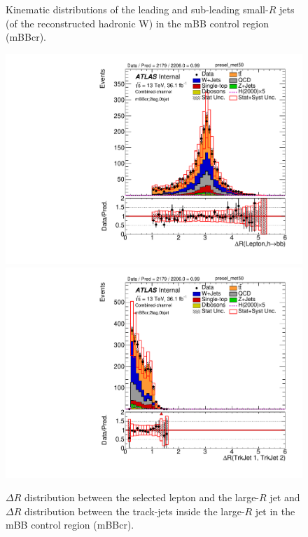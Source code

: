 \begin{figure}[!h]
\begin{center}
\caption{Kinematic distributions of the leading and sub-leading small-$R$ jets (of the reconstructed hadronic W)
in the mBB control region (mBBcr).}
\label{fig:boosted_mbbcr_whad_jets}
\end{center}
\end{figure}
 \newpage
\begin{figure}[!h]
\begin{center}
\includegraphics[scale=0.33]{./figures/boosted/PlotsInMbbCR/DataMC_2tag_0bjet_mbbcr_lepton_presel_met50_drHbbLep}
\includegraphics[scale=0.33]{./figures/boosted/PlotsInMbbCR/DataMC_2tag_0bjet_mbbcr_lepton_presel_met50_drbtrkjet1btrkjet2}\\
\caption{$\Delta R$ distribution between the selected lepton and the large-$R$ jet and $\Delta R$ distribution between the track-jets inside
the large-$R$ jet in the mBB control region (mBBcr).}
\label{fig:boosted_mbbcr_dr}
\end{center}
\end{figure}
 
